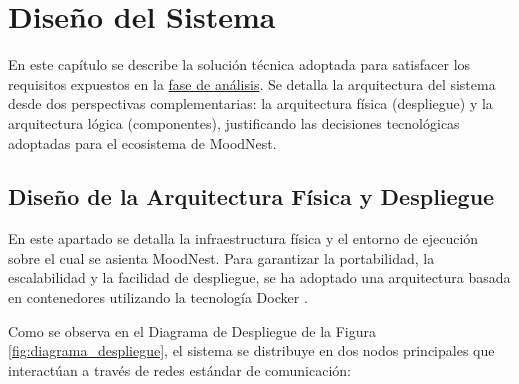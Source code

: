 \newpage
\section{Diseño del Sistema}

En este capítulo se describe la solución técnica adoptada para satisfacer los requisitos expuestos en la \hyperref[tab:rf_total]{fase de análisis}. Se detalla la arquitectura del sistema desde dos perspectivas complementarias: la arquitectura física (despliegue) y la arquitectura lógica (componentes), justificando las decisiones tecnológicas adoptadas para el ecosistema de MoodNest.

\subsection{Diseño de la Arquitectura Física y Despliegue}

En este apartado se detalla la infraestructura física y el entorno de ejecución sobre el cual se asienta MoodNest. Para garantizar la portabilidad, la escalabilidad y la facilidad de despliegue, se ha adoptado una arquitectura basada en contenedores utilizando la tecnología Docker \cite{bib:docker}.

Como se observa en el Diagrama de Despliegue de la Figura \ref{fig:diagrama_despliegue}, el sistema se distribuye en dos nodos principales que interactúan a través de redes estándar de comunicación:

